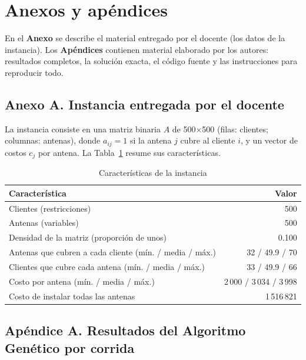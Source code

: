 \appendix
\section*{Anexos y apéndices}
\renewcommand{\thesubsection}{\Alph{subsection}}
En el \textbf{Anexo} se describe el material entregado por el docente (los datos de la instancia). Los \textbf{Apéndices} contienen material elaborado por los autores: resultados completos, la solución exacta, el código fuente y las instrucciones para reproducir todo.

\subsection*{Anexo A. Instancia entregada por el docente}

La instancia consiste en una matriz binaria $A$ de 500$\times$500 (filas: clientes; columnas: antenas), donde $a_{ij}=1$ si la antena $j$ cubre al cliente $i$, y un vector de costos $c_j$ por antena. La Tabla~\ref{tab:instancia} resume sus características.
\begin{table}[H]
\centering
\caption{Características de la instancia}
\label{tab:instancia}
\begin{tabular}{lr}
\toprule
Característica & Valor \\
\midrule
Clientes (restricciones) & 500 \\
Antenas (variables) & 500 \\
Densidad de la matriz (proporción de unos) & 0.100 \\
Antenas que cubren a cada cliente (mín. / media / máx.) & 32 / 49.9 / 70 \\
Clientes que cubre cada antena (mín. / media / máx.) & 33 / 49.9 / 66 \\
Costo por antena (mín. / media / máx.) & 2\,000 / 3\,034 / 3\,998 \\
Costo de instalar todas las antenas & 1\,516\,821 \\
\bottomrule
\end{tabular}
\end{table}

\subsection*{Apéndice A. Resultados del Algoritmo Genético por corrida}

